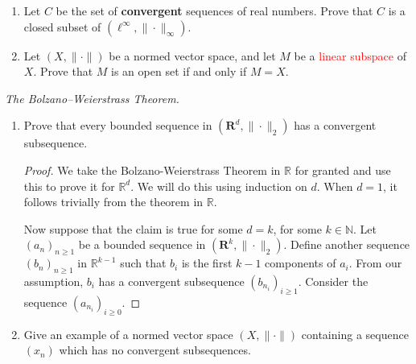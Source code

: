 \documentclass{article}
\newcommand{\R}{\mathbf{R}}
\theoremstyle{plain} %
\numberwithin{thm}{section} %
\theoremstyle{definition}
\begin{document}
\begin{enumerate}[label=(\alph*)]
\begin{proof}
            Let \(h(x) = f(x) - g_n(x)\). We try to maximize \(|h(x)|\). Taking its derivative with respect to \(x\), we get
            \[
                h^\prime(x) = f^\prime(x) - g_n^\prime(x) = \frac{x-\frac{1}{2}}{|x-\frac{1}{2}|} - \frac{e^{-\frac{n}{x}}-e^{-\frac{n}{1-x}}}{e^{-\frac{n}{x}}+e^{-\frac{n}{1-x}}}
            \]
            There is a critical point at \(x = \frac{1}{2}\) since \(h^\prime(\frac{1}{2})\) is undefined. Otherwise, if \(x > \frac{1}{2}\),
            \[
                h^\prime(x) = 1 - \frac{e^{-\frac{n}{x}}-e^{-\frac{n}{1-x}}}{e^{-\frac{n}{x}}+e^{-\frac{n}{1-x}}} = \frac{2e^{-\frac{n}{1-x}}}{e^{-\frac{n}{x}}+e^{-\frac{n}{1-x}}} > 0
            \]
            If \(x < 0\),
            \[
                h^\prime(x) = -1 - \frac{e^{-\frac{n}{x}}-e^{-\frac{n}{1-x}}}{e^{-\frac{n}{x}}+e^{-\frac{n}{1-x}}} = \frac{-2e^{-\frac{n}{x}}}{e^{-\frac{n}{x}}+e^{-\frac{n}{1-x}}} < 0
            \]
            Checking all critical points and endpoints, we see that
            \[
                h(\frac{1}{2}) = 0
                h(0) = 
            \]
            
        \end{proof}

        \item Let $C$ be the set of \textbf{convergent} sequences of real numbers. Prove that $C$ is a closed subset of $(\ell^\infty,\|\cdot\|_\infty)$.

        \item Let $(X,\|\cdot\|)$ be a normed vector space, and let $M$ be a \textcolor{red}{linear subspace} of $X$. Prove that $M$ is an open set if and only if $M=X$.
    \end{enumerate}

    \exercise \textit{The Bolzano--Weierstrass Theorem.}

    \begin{enumerate}[label=(\alph*)]
        \item Prove that every bounded sequence in $(\R^d,\|\cdot\|_2)$ has a convergent subsequence.
        
        \begin{proof}
            We take the Bolzano-Weierstrass Theorem in \(\mathbb{R}\) for granted and use this to prove it for \(\mathbb{R}^d\). We will do this using induction on \(d\). When \(d=1\), it follows trivially from the theorem in \(\mathbb{R}\).

            Now suppose that the claim is true for some \(d = k\), for some \(k \in \mathbb{N}\). Let \((a_n)_{n\geq1} \) be a bounded sequence in \((\R^k,\|\cdot\|_2)\). Define another sequence \((b_n)_{n\geq 1}\) in \(\mathbb{R}^{k-1}\) such that \(b_i\) is the first \(k-1\) components of \(a_i\). From our assumption, \(b_i\) has a convergent subsequence \((b_{n_i})_{i\geq1}\). Consider the sequence \((a_{n_i})_{i\geq0}\).
        \end{proof}
        \item Give an example of a normed vector space $(X,\|\cdot\|)$ containing a sequence $(x_n)$ which has no convergent subsequences.
    \end{enumerate}
\end{document}
